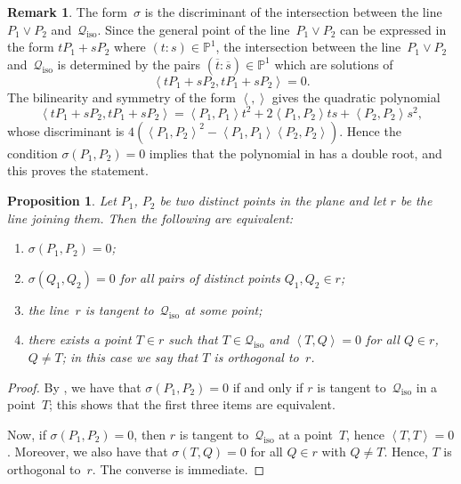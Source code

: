 \documentclass[a4paper, 11pt, reqno]{amsart}
\theoremstyle{plain}
\newtheorem{prop}[lemma]{Proposition}
\theoremstyle{definition}
\newtheorem{rmk}[lemma]{Remark}
\newcommand{\p}{\mathbb{P}}
\newcommand{\iso}{\mathcal{Q}_{\mathrm{iso}}}
\newcommand{\scl}[2]{\left\langle {#1}, {#2} \right\rangle}
\begin{document}
\begin{rmk}
\label{rmk:sigma_discr}
The form~$\sigma$ is the discriminant of the intersection between the line~$P_1 \vee P_2$ and~$\iso$.
Since the general point of the line~$P_1 \vee P_2$ can be expressed in the form
$t P_1 + sP_2$ where $(t:s) \in \p^1$, the intersection between the line~$P_1 \vee P_2$
and~$\iso$ is determined by the pairs $(\overline{t}: \overline{s}) \in \p^1$ which are solutions of
%
\[
  \scl{t P_1 + sP_2}{t P_1 + sP_2} =0.
\]
%
The bilinearity and symmetry of the form $\scl{}{}$ gives the quadratic polynomial
%
\begin{equation}
\label{eq:intersection_isotropic}
  \scl{t P_1 + sP_2}{t P_1 + sP_2} =
  \scl{P_1}{P_1} t^2 + 2\scl{P_1}{P_2} ts + \scl{P_2}{P_2}s^2,
\end{equation}
%
whose discriminant is $4 ( \scl{P_1}{P_2}^2 - \scl{P_1}{P_1} \scl{P_2}{P_2})$.
Hence the condition $\sigma(P_1, P_2)=0$ implies that the polynomial in 
has a double root, and this proves the statement.
\end{rmk}

\begin{prop}
\label{proposition:sigma_tangency}
Let $P_1$, $P_2$ be two distinct points in the plane and let $r$ be the line joining them.
Then the following are equivalent:
%
\begin{enumerate}
  \item $\sigma(P_1, P_2) = 0$;
  \item $\sigma(Q_1, Q_2) = 0$ for all pairs of distinct points $Q_1, Q_2 \in r$;
  \item the line~$r$ is tangent to~$\iso$ at some point;
  \item there exists a point $T \in r$ such that $T \in \iso$ and $\scl{T}{Q} = 0$ for all $Q \in r$, $Q \neq T$; in this case we say that $T$ is \emph{orthogonal} to~$r$.
\end{enumerate}
%
\end{prop}
\begin{proof}
By , we have that $\sigma(P_1, P_2) = 0$ if and only if $r$ is tangent to~$\iso$ in a point~$T$; this shows that the first three items are equivalent.

Now, if $\sigma(P_1, P_2) = 0$, then $r$ is tangent to~$\iso$ at a point~$T$, hence $\scl{T}{T} = 0$.
Moreover, we also have that $\sigma(T, Q) = 0$ for all $Q \in r$ with $Q \neq T$.
Hence, $T$ is orthogonal to~$r$.
The converse is immediate.
\end{proof}
\end{document}
